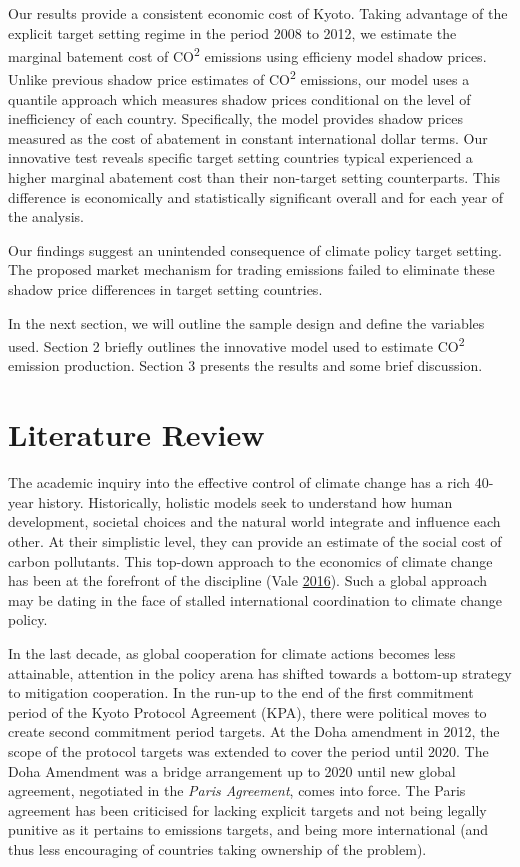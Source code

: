 \documentclass[
  12pt,
]{article}
\begin{document}
Our results provide a consistent economic cost of Kyoto. Taking advantage of the explicit target setting regime in the period 2008 to 2012, we estimate the marginal batement cost of CO\textsuperscript{2} emissions using efficieny model shadow prices. Unlike previous shadow price estimates of CO\textsuperscript{2} emissions, our model uses a quantile approach which measures shadow prices conditional on the level of inefficiency of each country. Specifically, the model provides shadow prices measured as the cost of abatement in constant international dollar terms. Our innovative test reveals specific target setting countries typical experienced a higher marginal abatement cost than their non-target setting counterparts. This difference is economically and statistically significant overall and for each year of the analysis.

Our findings suggest an unintended consequence of climate policy target setting. The proposed market mechanism for trading emissions failed to eliminate these shadow price differences in target setting countries.

In the next section, we will outline the sample design and define the variables used. Section 2 briefly outlines the innovative model used to estimate CO\textsuperscript{2} emission production. Section 3 presents the results and some brief discussion.

\hypertarget{literature-review}{%
\section{Literature Review}\label{literature-review}}

The academic inquiry into the effective control of climate change has a rich 40-year history. Historically, holistic models seek to understand how human development, societal choices and the natural world integrate and influence each other. At their simplistic level, they can provide an estimate of the social cost of carbon pollutants. This top-down approach to the economics of climate change has been at the forefront of the discipline (Vale \protect\hyperlink{ref-Vale2016}{2016}). Such a global approach may be dating in the face of stalled international coordination to climate change policy.

In the last decade, as global cooperation for climate actions becomes less attainable, attention in the policy arena has shifted towards a bottom-up strategy to mitigation cooperation. In the run-up to the end of the first commitment period of the Kyoto Protocol Agreement (KPA), there were political moves to create second commitment period targets. At the Doha amendment in 2012, the scope of the protocol targets was extended to cover the period until 2020. The Doha Amendment was a bridge arrangement up to 2020 until new global agreement, negotiated in the \emph{Paris Agreement}, comes into force. The Paris agreement has been criticised for lacking explicit targets and not being legally punitive as it pertains to emissions targets, and being more international (and thus less encouraging of countries taking ownership of the problem).
\end{document}
